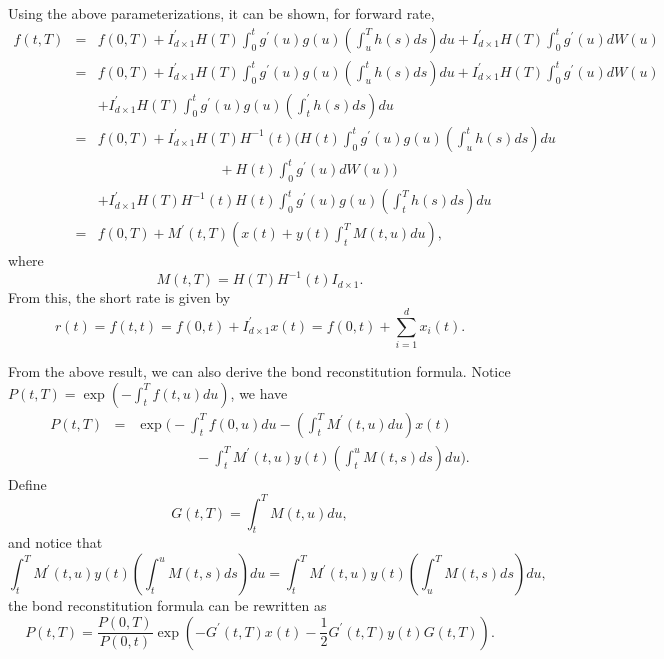 \documentclass[12pt]{article}
\begin{document}
  Using the above parameterizations, it can be shown, for forward rate,
  \begin{eqnarray}
    f(t,T) &=& f(0,T)+I_{d\times 1}^{\prime}H(T)\int_0^tg^{\prime}(u)g(u)\left(\int_u^Th(s)ds\right)du
              +I_{d\times 1}^{\prime}H(T)\int_0^tg^{\prime}(u)dW(u)\nonumber\\
           &=& f(0,T)+I_{d\times 1}^{\prime}H(T)\int_0^tg^{\prime}(u)g(u)\left(\int_u^th(s)ds\right)du
              +I_{d\times 1}^{\prime}H(T)\int_0^tg^{\prime}(u)dW(u)\nonumber\\
           && + I_{d\times 1}^{\prime}H(T)\int_0^tg^{\prime}(u)g(u)\left(\int_t^{\prime}h(s)ds\right)du\nonumber\\
           &=& f(0,T)+I_{d\times 1}^{\prime}H(T)H^{-1}(t)\Big(H(t)\int_0^tg^{\prime}(u)g(u)\left(\int_u^th(s)ds\right)du\nonumber\\
           &&\ \ \ \ \ \ \ \ \ \ \ \ \ \ \ \ \ \ \ \ \ \ \ \ \ \ \ \ \ \ \ \ \ \ \ \ \ \ \ +H(t)\int_0^tg^{\prime}(u)dW(u)\Big)\nonumber\\
           && + I_{d\times 1}^{\prime}H(T)H^{-1}(t)H(t)\int_0^tg^{\prime}(u)g(u)\left(\int_t^Th(s)ds\right)du\nonumber\\
           &=& f(0,T)+M^{\prime}(t,T)\left(x(t)+y(t)\int_t^TM(t,u)du\right),
  \end{eqnarray}
  where
  \begin{equation}
    M(t,T)=H(T)H^{-1}(t)I_{d\times 1}.
  \end{equation}
  From this, the short rate is given by
  \begin{equation}
    r(t)=f(t,t)=f(0,t)+I_{d\times 1}^{\prime}x(t)=f(0,t)+\sum_{i=1}^dx_i(t).
  \end{equation}
  
  
  From the above result, we can also derive the bond reconstitution formula. Notice $P(t,T)=\exp\left(-\int_t^Tf(t,u)du\right)$, we have
  \begin{eqnarray}
    P(t,T)&=&\exp\Bigg(-\int_t^Tf(0,u)du-\left(\int_t^TM^{\prime}(t,u)du\right)x(t) \nonumber\\
          &&\ \ \ \ \ \ \ \ \ \ \ \ \ \ \ \ \ \ \ -\int_t^TM^{\prime}(t,u)y(t)\left(\int_t^uM(t,s)ds\right)du\Bigg).
  \end{eqnarray}
  Define
  \begin{equation}
    G(t,T)=\int_t^TM(t,u)du,
  \end{equation}
  and notice that 
  \begin{equation}
    \int_t^TM^{\prime}(t,u)y(t)\left(\int_t^uM(t,s)ds\right)du = \int_t^TM^{\prime}(t,u)y(t)\left(\int_u^TM(t,s)ds\right)du,
  \end{equation}
  the bond reconstitution formula can be rewritten as
  \begin{equation}
    P(t,T)=\frac{P(0,T)}{P(0,t)}\exp\left(-G^{\prime}(t,T)x(t)-\frac{1}{2}G^{\prime}(t,T)y(t)G(t,T)\right).
    \label{reconstitution}
  \end{equation}
\end{document}
